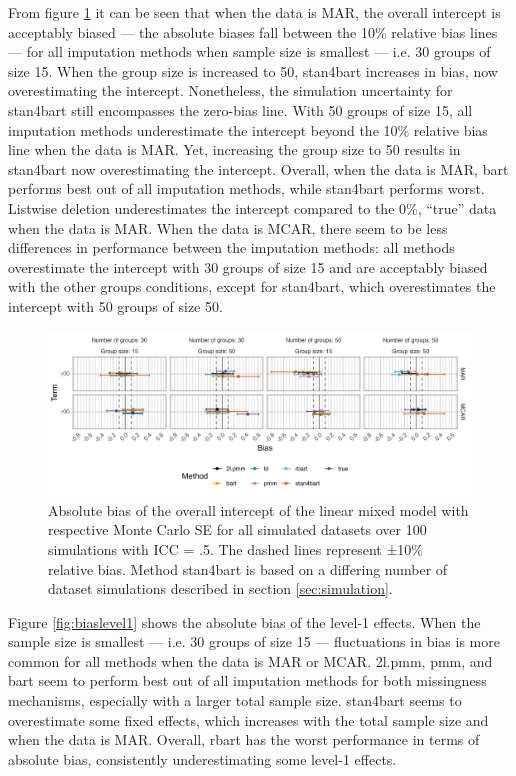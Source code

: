 \documentclass[10pt, a4paper, titlepage]{article}
\begin{document}
From figure \ref{fig:biasintercept} it can be seen that when the data is MAR, the overall intercept is acceptably biased --- the absolute biases fall between the 10\% relative bias lines --- for all imputation methods when sample size is smallest --- i.e. 30 groups of size 15. When the group size is increased to 50, stan4bart increases in bias, now overestimating the intercept. Nonetheless, the simulation uncertainty for stan4bart still encompasses the zero-bias line. With 50 groups of size 15, all imputation methods underestimate the intercept beyond the 10\% relative bias line when the data is MAR. Yet, increasing the group size to 50 results in stan4bart now overestimating the intercept. Overall, when the data is MAR, bart performs best out of all imputation methods, while stan4bart performs worst. Listwise deletion underestimates the intercept compared to the 0\%, ``true'' data when the data is MAR. When the data is MCAR, there seem to be less differences in performance between the imputation methods: all methods overestimate the intercept with 30 groups of size 15 and are acceptably biased with the other groups conditions, except for stan4bart, which overestimates the intercept with 50 groups of size 50. 

\begin{figure}[H]
    \centering
    \includegraphics[width=1\textwidth]{biasintercept.png}
    \caption{Absolute bias of the overall intercept of the linear mixed model with respective Monte Carlo SE for all simulated datasets over 100 simulations with ICC = .5. The dashed lines represent ±10\% relative bias. Method stan4bart is based on a differing number of dataset simulations described in section \ref{sec:simulation}.}
    \label{fig:biasintercept}
\end{figure}

Figure \ref{fig:biaslevel1} shows the absolute bias of the level-1 effects. When the sample size is smallest --- i.e. 30 groups of size 15 --- fluctuations in bias is more common for all methods when the data is MAR or MCAR. 2l.pmm, pmm, and bart seem to perform best out of all imputation methods for both missingness mechanisms, especially with a larger total sample size. stan4bart seems to overestimate some fixed effects, which increases with the total sample size and when the data is MAR. Overall, rbart has the worst performance in terms of absolute bias, consistently underestimating some level-1 effects.
\end{document}
